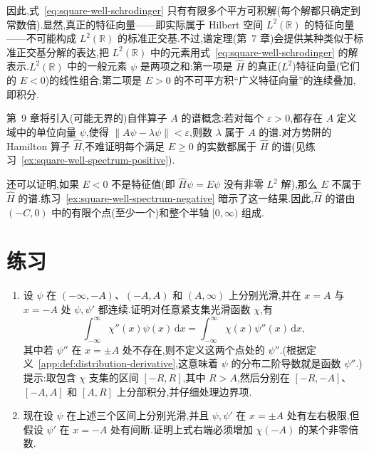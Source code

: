 因此,式~\eqref{eq:square-well-schrodinger} 只有有限多个平方可积解(每个解都只确定到常数倍).显然,真正的特征向量——即实际属于 Hilbert 空间 \(L^{2}(\mathbb{R})\) 的特征向量——不可能构成 \(L^{2}(\mathbb{R})\) 的标准正交基.不过,谱定理(第~7 章)会提供某种类似于标准正交基分解的表达,把 \(L^{2}(\mathbb{R})\) 中的元素用式~\eqref{eq:square-well-schrodinger} 的解表示.\(L^{2}(\mathbb{R})\) 中的一般元素 \(\psi\) 是两项之和:第一项是 \(\widehat H\) 的真正(\(L^{2}\))特征向量(它们的 \(E<0\))的线性组合;第二项是 \(E>0\) 的不可平方积“广义特征向量”的连续叠加,即积分.

第~9 章将引入(可能无界的)自伴算子 \(A\) 的谱概念:若对每个 \(\varepsilon>0\),都存在 \(A\) 定义域中的单位向量 \(\psi\),使得 \(\|A\psi-\lambda\psi\|<\varepsilon\),则数 \(\lambda\) 属于 \(A\) 的谱.对方势阱的 Hamilton 算子 \(\widehat H\),不难证明每个满足 \(E\ge0\) 的实数都属于 \(\widehat H\) 的谱(见练习~\ref{ex:square-well-spectrum-positive}).

还可以证明,如果 \(E<0\) 不是特征值(即 \(\widehat H\psi=E\psi\) 没有非零 \(L^{2}\) 解),那么 \(E\) 不属于 \(\widehat H\) 的谱.练习~\ref{ex:square-well-spectrum-negative} 暗示了这一结果.因此,\(\widehat H\) 的谱由 \((-C,0)\) 中的有限个点(至少一个)和整个半轴 \([0,\infty)\) 组成.

\section{练习}\label{sec:chapter5-exercises}

\begin{exercise}\label{ex:square-well-domain-distribution}
\begin{enumerate}
\item 设 \(\psi\) 在 \((-\infty,-A)\)、\((-A,A)\) 和 \((A,\infty)\) 上分别光滑,并在 \(x=A\) 与 \(x=-A\) 处 \(\psi,\psi'\) 都连续.证明对任意紧支集光滑函数 \(\chi\),有
\[
\int_{-\infty}^{\infty}\chi''(x)\psi(x)\,\mathrm{d}x
=\int_{-\infty}^{\infty}\chi(x)\psi''(x)\,\mathrm{d}x,
\]
其中若 \(\psi''\) 在 \(x=\pm A\) 处不存在,则不定义这两个点处的 \(\psi''\).(根据定义~\ref{app:def:distribution-derivative},这意味着 \(\psi\) 的分布二阶导数就是函数 \(\psi''\).)提示:取包含 \(\chi\) 支集的区间 \([-R,R]\),其中 \(R>A\),然后分别在 \([-R,-A]\)、\([-A,A]\) 和 \([A,R]\) 上分部积分,并仔细处理边界项.
\item 现在设 \(\psi\) 在上述三个区间上分别光滑,并且 \(\psi,\psi'\) 在 \(x=\pm A\) 处有左右极限,但假设 \(\psi'\) 在 \(x=-A\) 处有间断.证明上式右端必须增加 \(\chi(-A)\) 的某个非零倍数.
\end{enumerate}
\end{exercise}

